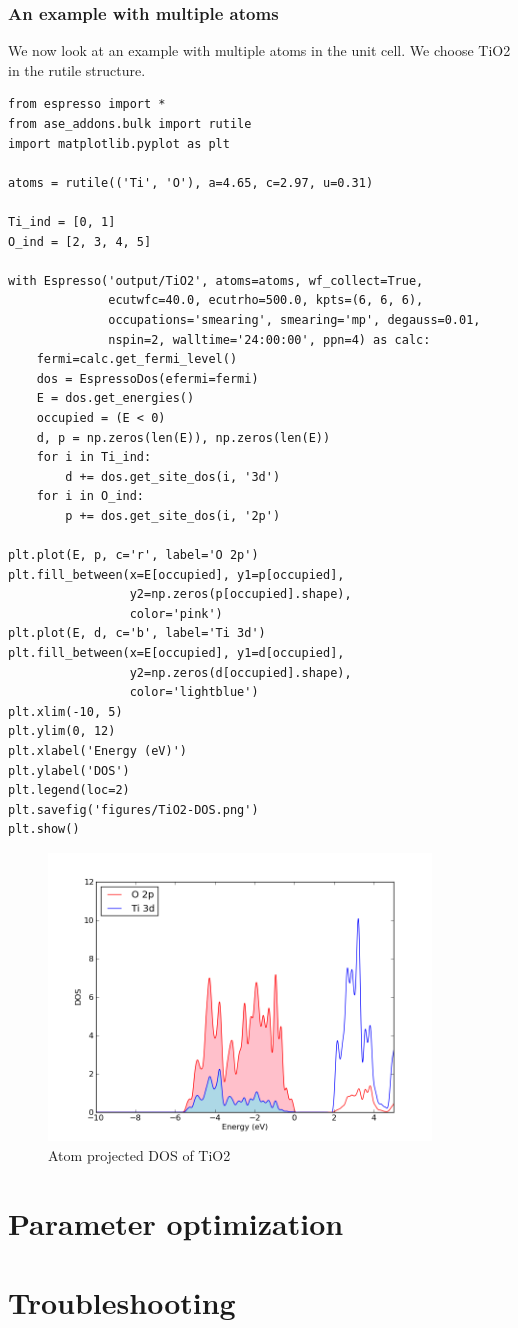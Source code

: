 \documentclass[colorlinks=true,urlcolor=blue,linkcolor=blue,citecolor=red]{article}
\begin{document}
\subsubsection{An example with multiple atoms}
\label{sec-3-2-4}
We now look at an example with multiple atoms in the unit cell. We choose TiO2 in the rutile structure.

\begin{verbatim}
from espresso import *
from ase_addons.bulk import rutile
import matplotlib.pyplot as plt

atoms = rutile(('Ti', 'O'), a=4.65, c=2.97, u=0.31)

Ti_ind = [0, 1]
O_ind = [2, 3, 4, 5]

with Espresso('output/TiO2', atoms=atoms, wf_collect=True,
              ecutwfc=40.0, ecutrho=500.0, kpts=(6, 6, 6),
              occupations='smearing', smearing='mp', degauss=0.01,
              nspin=2, walltime='24:00:00', ppn=4) as calc:
    fermi=calc.get_fermi_level()
    dos = EspressoDos(efermi=fermi)
    E = dos.get_energies()
    occupied = (E < 0)
    d, p = np.zeros(len(E)), np.zeros(len(E))
    for i in Ti_ind:
        d += dos.get_site_dos(i, '3d')
    for i in O_ind:
        p += dos.get_site_dos(i, '2p')

plt.plot(E, p, c='r', label='O 2p')
plt.fill_between(x=E[occupied], y1=p[occupied],
                 y2=np.zeros(p[occupied].shape),
                 color='pink')
plt.plot(E, d, c='b', label='Ti 3d')
plt.fill_between(x=E[occupied], y1=d[occupied],
                 y2=np.zeros(d[occupied].shape),
                 color='lightblue')
plt.xlim(-10, 5)
plt.ylim(0, 12)
plt.xlabel('Energy (eV)')
plt.ylabel('DOS')
plt.legend(loc=2)
plt.savefig('figures/TiO2-DOS.png')
plt.show()
\end{verbatim}

\begin{figure}[H]
\centering
\includegraphics[width=4in]{./figures/TiO2-DOS.png}
\caption{Atom projected DOS of TiO2}
\end{figure}

\section{Parameter optimization}
\label{sec-4}
\section{Troubleshooting}
\label{sec-5}


\end{document}
